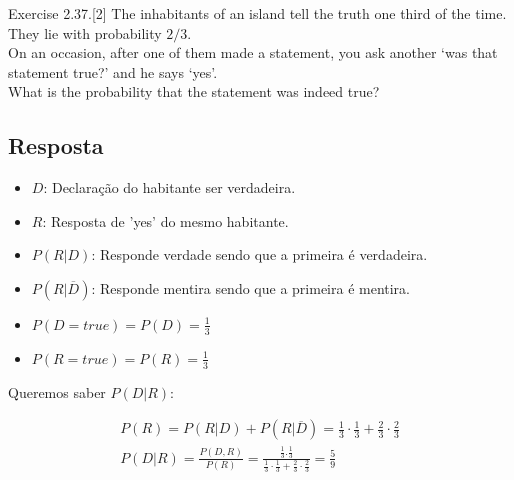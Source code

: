 \item
	Exercise 2.37.[2] The inhabitants of an island tell the truth one third of the
	time. They lie with probability $2/3$.\\
	On an occasion, after one of them made a statement, you ask another
	`was that statement true?' and he says `yes'.\\
	What is the probability that the statement was indeed true?

\subsection*{Resposta}

\begin{itemize}
	\item $D$: Declaração do habitante ser verdadeira.
	\item $R$: Resposta de 'yes' do mesmo habitante.
	\item $P(R|D)$: Responde verdade sendo que a primeira é verdadeira.
	\item $P(R|\overline{D})$: Responde mentira sendo que a primeira é mentira.
	\item $P(D = true) = P(D) = \frac{1}{3}$
	\item $P(R = true) = P(R) = \frac{1}{3}$
\end{itemize}

Queremos saber $P(D|R)$:

\[\begin{array}{l}
P(R) = P(R|D) + P(R|\overline{D}) = \frac{1}{3} \cdot \frac{1}{3} + \frac{2}{3} \cdot \frac{2}{3}\\
P(D|R) = \frac{{P(D,R)}}{{P(R)}} = \frac{{\frac{1}{3}.\frac{1}{3}}}{{\frac{1}{3} \cdot \frac{1}{3} + \frac{2}{3} \cdot \frac{2}{3}}} = \frac{5}{9}
\end{array}\]

